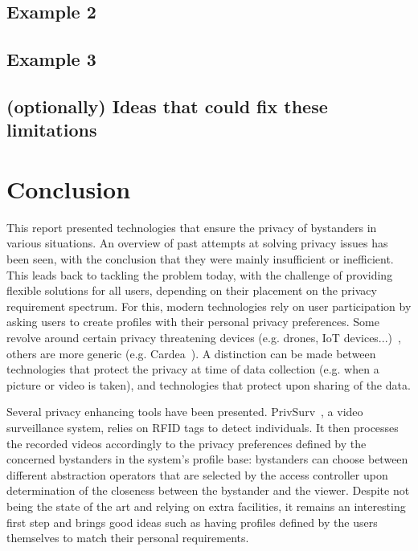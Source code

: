 \documentclass[conference]{IEEEtran}
\begin{document}
\subsection{Example 2}

\subsection{Example 3}

\subsection{(optionally) Ideas that could fix these limitations}

\section{Conclusion}\label{Conclusion}
This report presented technologies that ensure the privacy of bystanders in various situations. An overview of past attempts at solving privacy issues has been seen, with the conclusion that they were mainly insufficient or inefficient. This leads back to tackling the problem today, with the challenge of providing flexible solutions for all users, depending on their placement on the privacy requirement spectrum. For this, modern technologies rely on user participation by asking users to create profiles with their personal privacy preferences. Some revolve around certain privacy threatening devices (e.g. drones, \ac{IoT} devices...)~\cite{yao2017privacy, bernd2020bystanders}, others are more generic (e.g. Cardea~\cite{shu2016cardea}). A distinction can be made between technologies that protect the privacy at time of data collection (e.g. when a picture or video is taken), and technologies that protect upon sharing of the data.

Several privacy enhancing tools have been presented. PrivSurv~\cite{chinomi2008PriSurv}, a video surveillance system, relies on  \ac{RFID} tags to detect individuals. It then processes the recorded videos accordingly to the privacy preferences defined by the concerned bystanders in the system's profile base: bystanders can choose between different abstraction operators that are selected by the access controller upon determination of the closeness between the bystander and the viewer. Despite not being the state of the art and relying on extra facilities, it remains an interesting first step and brings good ideas such as having profiles defined by the users themselves to match their personal requirements. 
\end{document}
